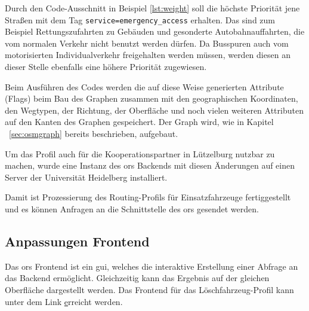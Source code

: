 Durch den Code-Ausschnitt in Beispiel \ref{lst:weight} soll die höchste Priorität jene Straßen mit dem Tag \texttt{service=emergency\_access} erhalten.
Das sind zum Beispiel Rettungszufahrten zu Gebäuden und gesonderte Autobahnauffahrten, die vom normalen Verkehr nicht benutzt werden dürfen.
Da Busspuren auch vom motorisierten Individualverkehr freigehalten werden müssen, werden diesen an dieser Stelle ebenfalls eine höhere Priorität zugewiesen.

Beim Ausführen des Codes werden die auf diese Weise generierten Attribute (Flags) beim Bau des Graphen zusammen mit den geographischen Koordinaten, den Wegtypen, der Richtung, der Oberfläche und noch vielen weiteren Attributen auf den Kanten des Graphen gespeichert.
Der Graph wird, wie in Kapitel ~\ref{sec:osmgraph} bereits beschrieben, aufgebaut.


Um das Profil auch für die Kooperationspartner in Lützelburg nutzbar zu machen, wurde eine Instanz des \gls{ors} Backends mit diesen Änderungen auf einen Server der Universität Heidelberg installiert.

Damit ist Prozessierung des Routing-Profils für Einsatzfahrzeuge fertiggestellt und es können Anfragen an die Schnittstelle des \gls{ors} gesendet werden.


\subsection{Anpassungen Frontend}

Das \gls{ors} Frontend ist ein \gls{gui}, welches die interaktive Erstellung einer Abfrage an das Backend ermöglicht.
Gleichzeitig kann das Ergebnis auf der gleichen Oberfläche dargestellt werden.
Das Frontend für das Löschfahrzeug-Profil kann unter dem Link \href{emergency.openrouteservice.org} erreicht werden.

\bigskip

